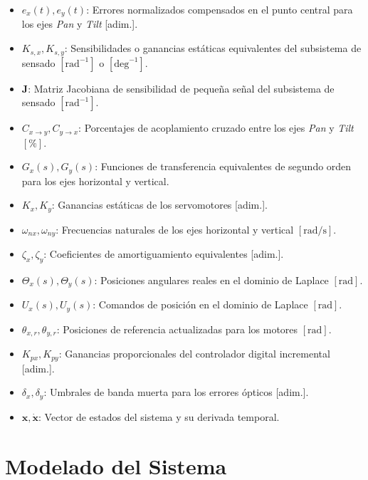 \documentclass[12pt,a4paper]{article}
\begin{document}
\begin{itemize}
    \item $e_x(t), e_y(t)$: Errores normalizados compensados en el punto central para los ejes \emph{Pan} y \emph{Tilt} [adim.].
    \item $K_{s,x}, K_{s,y}$: Sensibilidades o ganancias estáticas equivalentes del subsistema de sensado $[\text{rad}^{-1}]$ o $[\text{deg}^{-1}]$.
    \item $\mathbf{J}$: Matriz Jacobiana de sensibilidad de pequeña señal del subsistema de sensado $[\text{rad}^{-1}]$.
    \item $C_{x\rightarrow y}, C_{y\rightarrow x}$: Porcentajes de acoplamiento cruzado entre los ejes \emph{Pan} y \emph{Tilt} $[\%]$.
    \item $G_x(s), G_y(s)$: Funciones de transferencia equivalentes de segundo orden para los ejes horizontal y vertical.
    \item $K_x, K_y$: Ganancias estáticas de los servomotores [adim.].
    \item $\omega_{nx}, \omega_{ny}$: Frecuencias naturales de los ejes horizontal y vertical $[\text{rad/s}]$.
    \item $\zeta_x, \zeta_y$: Coeficientes de amortiguamiento equivalentes [adim.].
    \item $\Theta_x(s), \Theta_y(s)$: Posiciones angulares reales en el dominio de Laplace $[\text{rad}]$.
    \item $U_x(s), U_y(s)$: Comandos de posición en el dominio de Laplace $[\text{rad}]$.
    \item $\theta_{x,r}, \theta_{y,r}$: Posiciones de referencia actualizadas para los motores $[\text{rad}]$.
    \item $K_{px}, K_{py}$: Ganancias proporcionales del controlador digital incremental [adim.].
    \item $\delta_x, \delta_y$: Umbrales de banda muerta para los errores ópticos [adim.].
    \item $\mathbf{x}, \dot{\mathbf{x}}$: Vector de estados del sistema y su derivada temporal.
\end{itemize}

\section{Modelado del Sistema}
\end{document}
